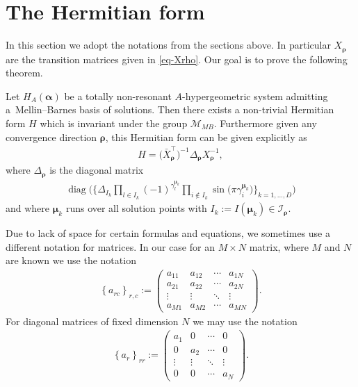 \section{The Hermitian form}\label{chap-herm}
In this section we adopt the notations from the sections above. In particular $X_{\bm\rho}$ are the transition matrices given in \eqref{eq-Xrho}. Our goal is to prove the following theorem.

\begin{Theorem}\label{MB-Hermitian}
Let $H_A(\bm{\alpha})$ be a totally non-resonant $A$-hypergeometric system admitting a~Mel\-lin--Barnes basis of solutions. Then there exists a non-trivial Hermitian form $H$ which is inva\-riant under the group $\mathcal{M}_{MB}$. Furthermore given any convergence direction $\bm\rho$, this Hermitian form can be given explicitly as
\begin{gather*}
H = \big(\bar{X}_{\bm\rho}^{\intercal}\big)^{-1} \Delta_{\bm\rho} X_{\bm\rho}^{-1},%
\end{gather*}
where $\Delta_{\bm\rho}$ is the diagonal matrix
\begin{gather}
\operatorname{diag}\bigg(\bigg\{\Delta_{I_k} \prod_{l \in I_k} (-1)^{\gamma_l^{\bm\mu_k}}\prod_{i \not \in I_k} \sin\big(\pi \gamma_i^{\bm\mu_k}\big)\bigg\}_{k=1,\dots,D}\bigg)
\label{eq-deltarho}
\end{gather}
and where $\bm\mu_k$ runs over all solution points with $I_k := I(\bm{\mu}_k) \in \mathcal{I}_{\bm\rho}$.
\end{Theorem}

\begin{Note}
Due to lack of space for certain formulas and equations, we sometimes use a different notation for matrices. In our case for an $M\times N$ matrix, where $M$ and $N$ are known we use the notation \begin{gather*}
\left\{a_{rc}\right\}_{r,c} := \begin{pmatrix}a_{11} & a_{12} & \cdots & a_{1N} \\ a_{21} & a_{22} & \cdots & a_{2N} \\ \vdots & \vdots & \ddots & \vdots \\ a_{M1} & a_{M2} & \cdots & a_{MN} \end{pmatrix}\!.
\end{gather*}
For diagonal matrices of fixed dimension $N$ we may use the notation
\begin{gather*}
\left\{a_{r}\right\}_{rr} := \begin{pmatrix}a_{1} & 0 & \cdots & 0 \\ 0 & a_{2} & \cdots & 0 \\ \vdots & \vdots & \ddots & \vdots \\ 0 & 0 & \cdots & a_{N} \end{pmatrix}\!.
\end{gather*}
\end{Note}

